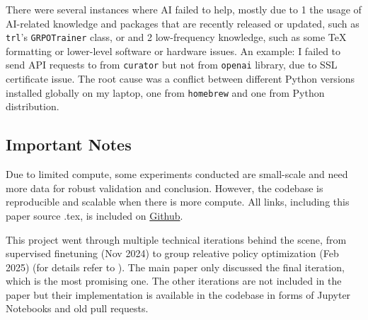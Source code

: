 There were several instances where AI failed to help, mostly due to \numlist{1} the usage of AI-related knowledge and packages that are recently released or updated, such as \verb|trl|'s \verb|GRPOTrainer| class, or and \numlist{2} low-frequency knowledge, such as some TeX formatting or lower-level software or hardware issues. An example: I failed to send API requests to \teachermodel from \verb|curator| but not from \verb|openai| library, due to SSL certificate issue. The root cause was a conflict between different Python versions installed globally on my laptop, one from \verb|homebrew| and one from Python distribution.

\subsection*{Important Notes} \label{sec:important-notes}

Due to limited compute, some experiments conducted are small-scale and need more data for robust validation and conclusion. However, the codebase is reproducible and scalable when there is more compute. All links, including this paper source .tex, is included on \hyperlink{https://github.com/chiffonng/mnemonic-gen}{Github}.

This project went through multiple technical iterations behind the scene, from supervised finetuning (Nov 2024) to group releative policy optimization (Feb 2025) (for details refer to ). The main paper only discussed the final iteration, which is the most promising one. The other iterations are not included in the paper but their implementation is available in the codebase in forms of Jupyter Notebooks and old pull requests.

\clearpage

\tableofcontents
